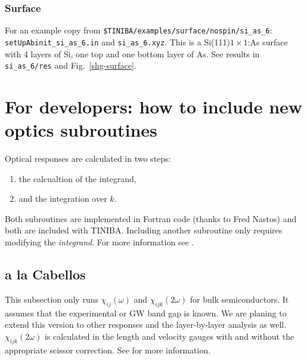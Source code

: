 \documentclass[openany,oneside]{book}
\numberwithin{equation}{section}
\begin{document}
\subsection{Surface} 
For an example copy from \verb=$TINIBA/examples/surface/nospin/si_as_6=:\\
\verb=setUpAbinit_si_as_6.in= and \verb=si_as_6.xyz=. This is a
Si(111)$1\times 1$:As surface with 4 layers of Si, one top and one bottom
layer of As. See results in \verb=si_as_6/res= and Fig.~\ref{shg-surface}.


\chapter{For developers: how to include new optics subroutines}
Optical responses are calculated in two steps:

\begin{enumerate}
\item the calcualtion of the integrand,
\item and the integration over $k$.
\end{enumerate}

Both subroutines are implemented in Fortran code (thanks to Fred Nastos) and both are included with TINIBA. Including another subroutine only requires modifying the \emph{integrand}. For more information see \cite{sipe_second-order_2000}.

\section{a la Cabellos}

This subsection only runs $\chi_{ij}(\omega)$ and $\chi_{ijk}(2\omega)$ for bulk semiconductors. It assumes that the experimental or GW band gap is known. We are planing to extend this version to other responses and the layer-by-layer analysis as well. $\chi_{ijk}(2\omega)$ is calculated in the length and velocity gauges with and without the appropriate scissor correction. See \cite{cabellos_effects_2009} for more information.
\end{document}
